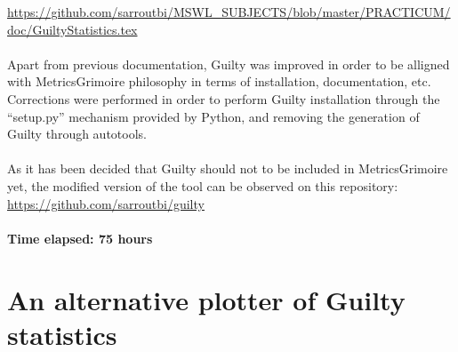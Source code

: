 \documentclass[11pt]{article}
\begin{document}
\url{https://github.com/sarroutbi/MSWL_SUBJECTS/blob/master/PRACTICUM/doc/GuiltyStatistics.tex}\\
\\
Apart from previous documentation, Guilty was improved in order to be alligned with MetricsGrimoire philosophy in terms of installation, documentation, etc.
Corrections were performed in order to perform Guilty installation through the ``setup.py'' mechanism provided by Python, and removing the generation of Guilty through autotools.\\
\\
As it has been decided that Guilty should not to be included in MetricsGrimoire yet, the modified version of the tool can be observed on this repository:\\

\url{https://github.com/sarroutbi/guilty}\\
\\
\textbf{Time elapsed: 75 hours}

\section{An alternative plotter of Guilty statistics}
\end{document}
